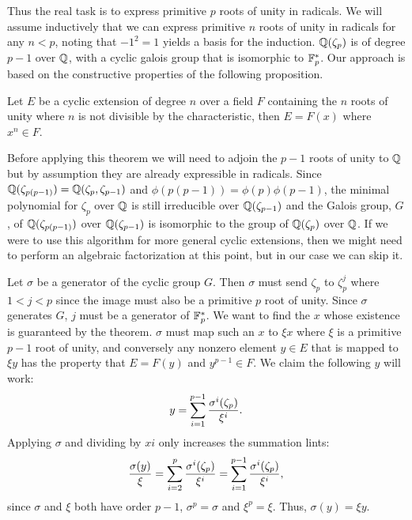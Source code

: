 Thus the real task is to express primitive $p${\th} roots of unity in
radicals.  We will assume inductively that we can express primitive
$n${\th} roots of unity in radicals for any $n<p$, noting that
$-1^2=1$ yields a basis for the induction.  $\mathbb{Q}(\zeta_p)$ is of degree
$p-1$ over $\mathbb{Q}$, with a cyclic galois group that is isomorphic to
$\mathbb{F}_p^{\ast}$.  Our approach is based on the constructive properties
of the following proposition.

\begin{proposition}
Let $E$ be a cyclic extension of degree $n$ over a field $F$
containing the $n${\th} roots of unity where $n$ is not divisible by
the characteristic, then $E = F(x)$ where $x^n \in F$.
\end{proposition}

Before applying this theorem we will need to adjoin the $p-1${\th} roots
of unity to $\mathbb{Q}$ but by assumption they are already expressible in
radicals.  Since $\mathbb{Q}(\zeta_{p(p-1)}) = \mathbb{Q}(\zeta_p,\zeta_{p-1})$ and
$\phi(p(p-1)) = \phi(p) \phi(p-1)$, the minimal polynomial for
$\zeta_p$ over $\mathbb{Q}$ is still irreducible over $\mathbb{Q}(\zeta_{p-1})$ and
the Galois group, $G$, of $\mathbb{Q}(\zeta_{p(p-1)})$ over $\mathbb{Q}(\zeta_{p-1})$
is isomorphic to the group of $\mathbb{Q}(\zeta_p)$ over $\mathbb{Q}$.  If we were to
use this algorithm for more general cyclic extensions, then we might
need to perform an algebraic factorization at this point, but in our
case we can skip it.

Let $\sigma$ be a generator of the cyclic group $G$. Then $\sigma$
must send $\zeta_p$ to $\zeta_p^j$ where $1<j<p$ since the image must
also be a primitive $p${\th} root of unity.  Since $\sigma$ generates
$G$, $j$ must be a generator of $\mathbb{F}_p^{\ast}$.
We want to find the $x$ whose existence is guaranteed by the theorem.
$\sigma$ must map such an $x$ to $\xi x$ where $\xi$ is a primitive
$p-1${\th} root of unity, and conversely any nonzero element $y \in E$
that is mapped to $\xi y$ has the property that $E = F(y)$ and
$y^{p-1} \in F$.  We claim the following $y$ will work:
\begin{equation} \label{Rad:HilGen:Eq}
y=\sum_{i=1}^{p-1} {\sigma^i(\zeta_p) \over \xi^i}.
\end{equation}
Applying $\sigma$ and dividing by $xi$ only increases the summation
lints:
\[
{\sigma(y) \over \xi} = \sum_{i=2}^p {\sigma^i(\zeta_p) \over
\xi^i} = \sum_{i=1}^{p-1} {\sigma^i(\zeta_p) \over \xi^i},
\]
since $\sigma$ and $\xi$ both have order $p-1$, $\sigma^p=\sigma$ and
$\xi^p=\xi$. Thus, $\sigma(y) = \xi y$.  

